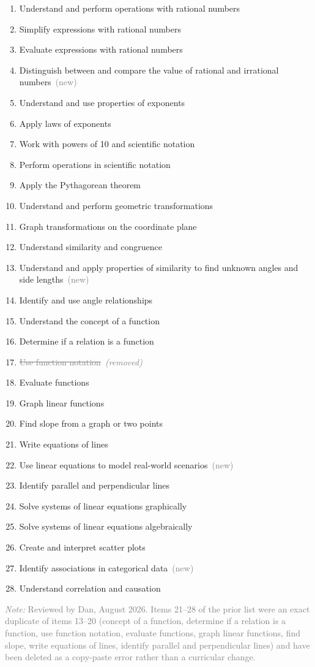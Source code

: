 \documentclass[11pt]{article}
\newcommand{\newprof}{\ {\small\textcolor{gray}{(new)}}}
\newcommand{\cut}[1]{\item[\textcolor{gray}{\small$\times$}]%
  \textcolor{gray}{\sout{#1}\ \textit{(removed)}}}
\newcommand{\revnote}[1]{\par\medskip
  {\small\textcolor{gray}{\textit{Note:} #1}}}
\begin{document}
\begin{enumerate}
\item Understand and perform operations with rational numbers
\item Simplify expressions with rational numbers
\item Evaluate expressions with rational numbers
\item Distinguish between and compare the value of rational and irrational
      numbers\newprof
\item Understand and use properties of exponents
\item Apply laws of exponents
\item Work with powers of 10 and scientific notation
\item Perform operations in scientific notation
\item Apply the Pythagorean theorem
\item Understand and perform geometric transformations
\item Graph transformations on the coordinate plane
\item Understand similarity and congruence
\item Understand and apply properties of similarity to find unknown angles and side
      lengths\newprof
\item Identify and use angle relationships
\item Understand the concept of a function
\item Determine if a relation is a function
\cut{Use function notation}
\item Evaluate functions
\item Graph linear functions
\item Find slope from a graph or two points
\item Write equations of lines
\item Use linear equations to model real-world scenarios\newprof
\item Identify parallel and perpendicular lines
\item Solve systems of linear equations graphically
\item Solve systems of linear equations algebraically
\item Create and interpret scatter plots
\item Identify associations in categorical data\newprof
\item Understand correlation and causation
\end{enumerate}
\revnote{Reviewed by Dan, August 2026. Items 21--28 of the prior list were an exact
  duplicate of items 13--20 (concept of a function, determine if a relation is a
  function, use function notation, evaluate functions, graph linear functions, find
  slope, write equations of lines, identify parallel and perpendicular lines) and have
  been deleted as a copy-paste error rather than a curricular change.}
\end{document}
